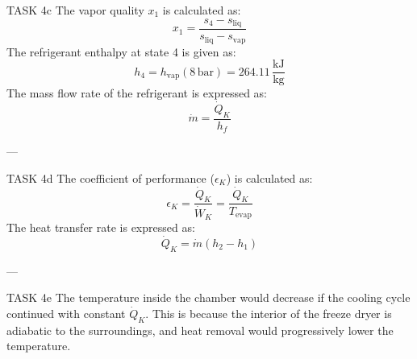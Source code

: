 TASK 4c  
The vapor quality \( x_1 \) is calculated as:  
\[
x_1 = \frac{s_4 - s_{\text{liq}}}{s_{\text{liq}} - s_{\text{vap}}}
\]  
The refrigerant enthalpy at state 4 is given as:  
\[
h_4 = h_{\text{vap}}(8 \, \text{bar}) = 264.11 \, \frac{\text{kJ}}{\text{kg}}
\]  
The mass flow rate of the refrigerant is expressed as:  
\[
\dot{m} = \frac{\dot{Q}_K}{h_f}
\]  

---

TASK 4d  
The coefficient of performance (\( \epsilon_K \)) is calculated as:  
\[
\epsilon_K = \frac{\dot{Q}_K}{\dot{W}_K} = \frac{\dot{Q}_K}{T_{\text{evap}}}
\]  
The heat transfer rate is expressed as:  
\[
\dot{Q}_K = \dot{m} (h_2 - h_1)
\]  

---

TASK 4e  
The temperature inside the chamber would decrease if the cooling cycle continued with constant \( \dot{Q}_K \). This is because the interior of the freeze dryer is adiabatic to the surroundings, and heat removal would progressively lower the temperature.